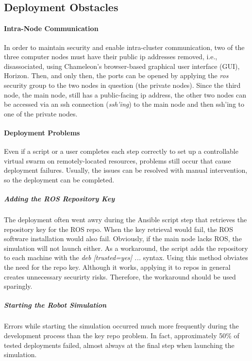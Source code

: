 \documentclass[9pt,twocolumn,twoside]{../../styles/osajnl}
\begin{document}
\subsection{Deployment Obstacles}
\paragraph{Intra-Node Communication}
In order to maintain security and enable intra-cluster communication, two of the three computer nodes must have their public ip addresses removed, i.e., disassociated, using Chameleon's browser-based graphical user interface (GUI), Horizon.  Then, and only then, the ports can be opened by applying the \textit{ros} security group to the two nodes in question (the private nodes).  Since the third node, the main node, still has a public-facing ip address, the other two nodes can be accessed via an ssh connection (\textit{ssh'ing}) to the main node and then ssh'ing to one of the private nodes.

\paragraph{Deployment Problems}
Even if a script or a user completes each step correctly to set up a controllable virtual swarm on remotely-located resources, problems still occur that cause deployment failures.  Usually, the issues can be resolved with manual intervention, so the deployment can be completed.  

\subparagraph{Adding the ROS Repository Key}
The deployment often went awry during the Ansible script step that retrieves the repository key for the ROS repo.  When the key retrieval would fail, the ROS software installation would also fail.  Obviously, if the main node lacks ROS, the simulation will not launch either.  As a workaround, the script adds the repository to each machine with the \textit{deb [trusted=yes] ...} syntax.  Using this method obviates the need for the repo key.  Although it works, applying it to repos in general creates unnecessary securirty risks.  Therefore, the workaround should be used sparingly.  

\subparagraph{Starting the Robot Simulation}
Errors while starting the simulation occurred much more frequently during the development process than the key repo problem.  In fact, approximately 50\% of tested deployments failed, almost always at the final step when launching the simulation.  
\end{document}
